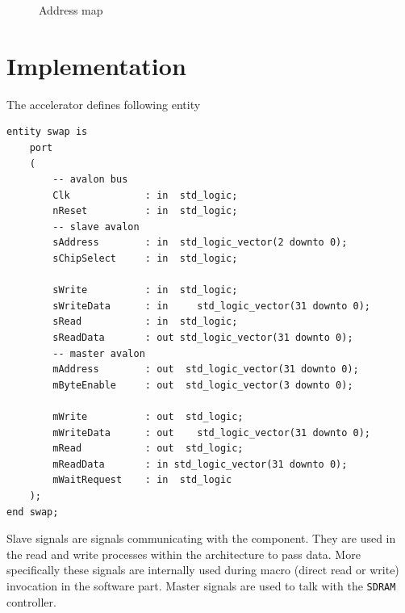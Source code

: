 \begin{figure}[H]
	\begin{center}
	\end{center}
	\caption{Address map}
	\label{fig:addresses}
\end{figure}


\section{Implementation}
The accelerator defines following entity
\begin{verbatim}
entity swap is
    port
    (	
    	-- avalon bus
    	Clk             : in  std_logic;
    	nReset          : in  std_logic;
    	-- slave avalon 
    	sAddress        : in  std_logic_vector(2 downto 0);
    	sChipSelect     : in  std_logic;
    	
    	sWrite          : in  std_logic;
    	sWriteData      : in	 std_logic_vector(31 downto 0);
    	sRead           : in  std_logic;
    	sReadData       : out std_logic_vector(31 downto 0);
    	-- master avalon 
    	mAddress        : out  std_logic_vector(31 downto 0);
    	mByteEnable     : out  std_logic_vector(3 downto 0);
    	
    	mWrite          : out  std_logic;
    	mWriteData      : out	 std_logic_vector(31 downto 0);
    	mRead           : out  std_logic;
    	mReadData       : in std_logic_vector(31 downto 0);
    	mWaitRequest    : in  std_logic
    );
end swap;
\end{verbatim}
Slave signals are signals communicating with the component. They are used in the read and write processes within the architecture to pass data. More specifically these signals are internally used during macro (direct read or write) invocation in the software part. Master signals are used to talk with the \verb|SDRAM| controller.

